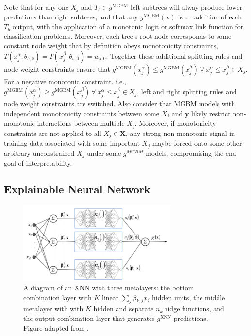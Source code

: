\documentclass[information,article,submit,moreauthors,pdftex]{definitions/mdpi}
\begin{document}
\noindent Note that for any one $X_j$ and $T_b \in g^{\text{MGBM}}$ left subtrees will alway produce lower predictions than right subtrees, and that any $g^{\text{MGBM}}(\mathbf{x})$ is an addition of each $T_b$ output, with the application of a monotonic logit or softmax link function for classification problems. Moreover, each tree's root node corresponds to some constant node weight that by definition obeys monotonicity constraints, $ T(x^{\alpha}_j; \theta_{b,0}) = T(x^{\beta}_j; \theta_{b,0}) = w_{b,0}$. Together these additional splitting rules and node weight constraints ensure that $g^{\text{MGBM}}(x^{\alpha}_j)  \le g^{\text{MGBM}}(x^{\beta}_j) ~\forall ~x^{\alpha}_j \le x^{\beta}_j \in X_j$. For a negative monotonic constraint, i.e., $g^{\text{MGBM}}(x^{\alpha}_j)  \ge g^{\text{MGBM}}(x^{\beta}_j) ~\forall ~x^{\alpha}_j \le x^{\beta}_j \in X_j$, left and right splitting rules and node weight constraints are switched. Also consider that MGBM models with independent monotonicity constraints between some $X_j$ and $\mathbf{y}$ likely restrict non-monotonic interactions between multiple $X_j$. Moreover, if monotonicity constraints are not applied to all $X_j \in \mathbf{X}$, any strong non-monotonic signal in training data associated with some important $X_j$ maybe forced onto some other arbitrary unconstrained $X_j$ under some $g^{MGBM}$ models, compromising the end goal of interpretability.

\subsection{Explainable Neural Network}\label{a_ssec:xnn}

\begin{figure}[H]
	\centering
	\includegraphics[width=8cm]{img/xnn_arch.png}
	\caption{A diagram of an XNN with three metalayers: the bottom combination layer with  $K$ linear $\sum_j\beta_{k,j}x_j$ hidden units, the middle metalayer with with $K$ hidden and separate $n_k$ ridge functions, and the output combination layer that generates $g^{\text{XNN}}$ predictions. Figure adapted from \citet{wf_xnn}.}
	\label{fig:xnn_arch}
\end{figure}  
\end{document}
